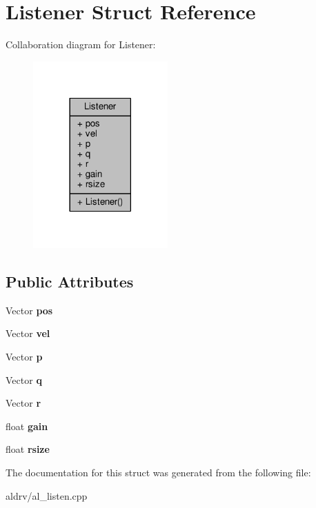 \hypertarget{structListener}{}\section{Listener Struct Reference}
\label{structListener}


Collaboration diagram for Listener\+:
\nopagebreak
\begin{figure}[H]
\begin{center}
\leavevmode
\includegraphics[width=146pt]{d3/d79/structListener__coll__graph}
\end{center}
\end{figure}
\subsection*{Public Attributes}
\begin{DoxyCompactItemize}
\item 
Vector {\bfseries pos}\hypertarget{structListener_a794c48c2b3b7c35265e80647c8d620e3}{}\label{structListener_a794c48c2b3b7c35265e80647c8d620e3}

\item 
Vector {\bfseries vel}\hypertarget{structListener_a2dc69f9dc5bf01cc94a4646aa6d5b7fa}{}\label{structListener_a2dc69f9dc5bf01cc94a4646aa6d5b7fa}

\item 
Vector {\bfseries p}\hypertarget{structListener_a9e43e6e974a52b1514b7c7dbdf25b754}{}\label{structListener_a9e43e6e974a52b1514b7c7dbdf25b754}

\item 
Vector {\bfseries q}\hypertarget{structListener_aa5270db37bef272f36ce048cba6c92d6}{}\label{structListener_aa5270db37bef272f36ce048cba6c92d6}

\item 
Vector {\bfseries r}\hypertarget{structListener_a78b60a93fbd0b61d42ccd9aaf295824d}{}\label{structListener_a78b60a93fbd0b61d42ccd9aaf295824d}

\item 
float {\bfseries gain}\hypertarget{structListener_adf0a3846f74db696f902fac788e0d551}{}\label{structListener_adf0a3846f74db696f902fac788e0d551}

\item 
float {\bfseries rsize}\hypertarget{structListener_a3db59e868f1238752764a3b7ef90d604}{}\label{structListener_a3db59e868f1238752764a3b7ef90d604}

\end{DoxyCompactItemize}


The documentation for this struct was generated from the following file\+:\begin{DoxyCompactItemize}
\item 
aldrv/al\+\_\+listen.\+cpp\end{DoxyCompactItemize}
